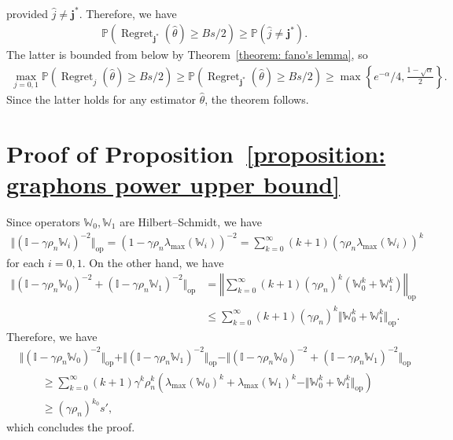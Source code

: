 \documentclass[11pt]{article}
\newcommand{\op}{\mathrm{op}}
\newcommand{\bbW}{\mathbb{W}}
\newcommand{\bbP}{\mathbb{P}}
\newcommand{\bbI}{\mathbb{I}}
\newcommand{\<}{\langle}
\renewcommand{\>}{\rangle}
\newcommand{\regret}{\operatorname{Regret}}
\newcommand{\bj}{\mathbf{j}}
\theoremstyle{plain}
\theoremstyle{definition}
\theoremstyle{remark}
\begin{document}
{\begin{align*}
\end{align*}
provided $\widehat{j} \neq \bj^*$. Therefore, we have
\begin{align*}
    \bbP \left (\regret_{\bj^*}(\widehat{\theta}) \ge B s/ 2 \right ) \ge \bbP (\widehat{j} \neq \bj^*).
\end{align*}
The latter is bounded from below by Theorem~\ref{theorem: fano's lemma}, so
\begin{align*}
    \max_{j = 0, 1} \bbP \left (\regret_{j}(\widehat{\theta}) \ge B s/ 2 \right ) \ge \bbP \left (\regret_{\bj^*}(\widehat{\theta}) \ge B s/ 2 \right ) \ge \max \left \{ e^{-\alpha}/4, \frac{1 - \sqrt{\alpha}}{2}\right \}.
\end{align*}
Since the latter holds for any estimator $\widehat{\theta}$, the theorem follows.

\section{Proof of Proposition~\ref{proposition: graphons power upper bound}}
\label{section: graphons deficit power lower bound proof}

Since operators $\bbW_0, \bbW_1$ are  Hilbert–Schmidt, we have
    \begin{align*}
        \Vert (\bbI - \gamma \rho_n \bbW_i)^{-2} \Vert_{\op} = (1 - \gamma \rho_n \lambda_{\max}(\bbW_i))^{-2} = \sum_{k = 0}^{\infty} (k + 1) (\gamma \rho_n \lambda_{\max}(\bbW_i))^k
    \end{align*}
    for each $i = 0,1$. On the other hand, we have
    \begin{align*}
        \Vert (\bbI - \gamma \rho_n \bbW_0)^{-2} + (\bbI - \gamma \rho_n \bbW_1)^{-2} \Vert_{\op} & = \left \Vert \sum_{k = 0}^{\infty} (k + 1) (\gamma \rho_n)^k (\bbW_0^k + \bbW_1^k) \right \Vert_{\op} \\
        & \le \sum_{k = 0}^{\infty} (k + 1) (\gamma \rho_n)^k \Vert \bbW_0^k + \bbW_1^k \Vert_{\op}.
    \end{align*}
    Therefore, we have
    \begin{align*}
        & \Vert (\bbI - \gamma \rho_n \bbW_0)^{-2} \Vert_{\op} +  \Vert (\bbI - \gamma \rho_n \bbW_1)^{-2} \Vert_{\op} - \Vert (\bbI - \gamma \rho_n \bbW_0)^{-2} + (\bbI - \gamma \rho_n \bbW_1)^{-2} \Vert_{\op} \\
        & \qquad \ge \sum_{k = 0}^{\infty} (k + 1) \gamma^k \rho_n^k (\lambda_{\max} (\bbW_0)^k + \lambda_{\max} (\bbW_1)^k - \Vert \bbW_0^k + \bbW_1^k \Vert_{\op})  \\
        & \qquad \ge (\gamma \rho_n)^{k_0} s', 
    \end{align*}
    which concludes the proof.
 

}
\end{document}
